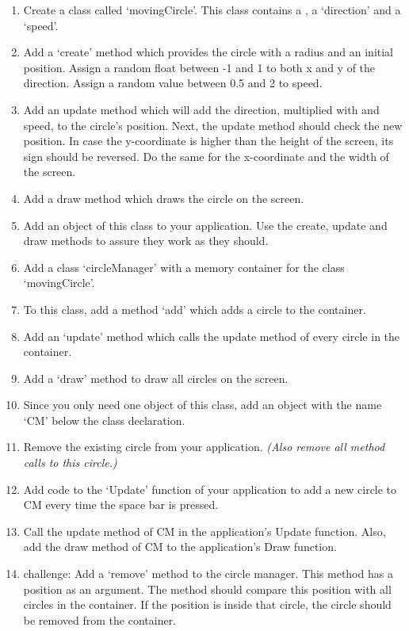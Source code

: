 \begin{exercise}
\begin{enumerate}
\item Create a class called `movingCircle'. This class contains a , a  `direction' and a  `speed'. 
\item Add a `create' method which provides the circle with a radius and an initial position. Assign a random float between -1 and 1 to both x and y of the direction. Assign a random value between 0.5 and 2 to speed.
\item Add an update method which will add the direction, multiplied with  and speed, to the circle's position. Next, the update method should check the new position. In case the y-coordinate is higher than the height of the screen, its sign should be reversed. Do the same for the x-coordinate and the width of the screen. 
\item Add a draw method which draws the circle on the screen.
\item Add an object of this class to your application. Use the create, update and draw methods to assure they work as they should.

\item Add a class `circleManager' with a memory container for the class `movingCircle'.
\item To this class, add a method `add' which adds a circle to the container.
\item Add an `update' method which calls the update method of every circle in the container.
\item Add a `draw' method to draw all circles on the screen.
\item Since you only need one object of this class, add an object with the name `CM' below the class declaration.

\item Remove the existing circle from your application. \textsl{(Also remove all method calls to this circle.)}
\item Add code to the `Update' function of your application to add a new circle to CM every time the space bar is pressed.
\item Call the update method of CM in the application's Update function. Also, add the draw method of CM to the application's Draw function.

\item challenge: Add a `remove' method to the circle manager. This method has a position as an argument. The method should compare this position with all circles in the container. If the position is inside that circle, the circle should be removed from the container.
\end{enumerate}
\end{exercise}

